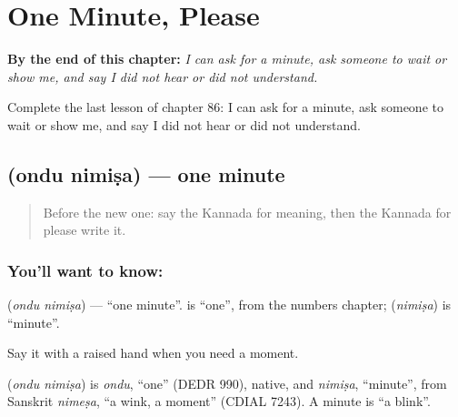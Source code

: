 
\chapter{One Minute, Please}
\label{ch:ka-one-minute-please}

\begin{chapteropening}
\textbf{By the end of this chapter:} \emph{I can ask for a minute, ask someone to wait or show me, and say I did not hear or did not understand.}

Complete the last lesson of chapter 86: I can ask for a minute, ask someone to wait or show me, and say I did not hear or did not understand.
\end{chapteropening}

\section[\texorpdfstring{\kn{ಒಂದು} \kn{ನಿಮಿಷ} (ondu nimiṣa)}{ಒಂದು ನಿಮಿಷ (ondu nimiṣa)}]{  (ondu nimiṣa) — one minute}

\label{lesson:KA-C86-oneminute}



\begin{quote}
Before the new one: say the Kannada for meaning, then the Kannada for please write it.
\end{quote}

\subsection*{You'll want to know:  }
\textbf{ } (\emph{ondu nimiṣa}) — \textquotedblleft{}one minute\textquotedblright{}. \textbf{} is \textquotedblleft{}one\textquotedblright{}, from the numbers chapter; \textbf{} (\emph{nimiṣa}) is \textquotedblleft{}minute\textquotedblright{}.

Say it with a raised hand when you need a moment.

\begin{cousinweb}
\textbf{ } (\emph{ondu nimiṣa}) is \emph{ondu}, \textquotedblleft{}one\textquotedblright{} (DEDR 990), native, and \emph{nimiṣa}, \textquotedblleft{}minute\textquotedblright{}, from Sanskrit \emph{nimeṣa}, \textquotedblleft{}a wink, a moment\textquotedblright{} (CDIAL 7243). A minute is \textquotedblleft{}a blink\textquotedblright{}.
\end{cousinweb}

